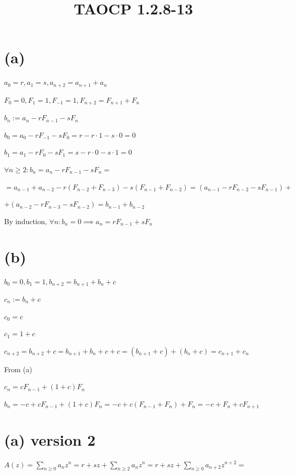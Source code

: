 \documentclass{article}
\title{TAOCP 1.2.8\mbox{-}13}
\begin{document}
\maketitle

\section*{(a)}

\( a_{0} = r, a_{1}=s, a_{n+2} = a_{n+1} + a_{n} \)

\( F_{0} = 0, F_{1}=1, F_{-1}=1, F_{n+2} = F_{n+1} + F_{n} \)

\( b_{n} := a_{n} - rF_{n-1} - sF_{n} \)

\( b_{0} = a_{0} - rF_{-1} - s F_{0} = r - r \cdot 1 - s \cdot 0 = 0 \)

\( b_{1} = a_{1} - rF_{0} - s F_{1} = s - r \cdot 0 - s \cdot 1 = 0 \)

\( \forall n \geq 2: b_{n} = a_{n} - rF_{n-1} - sF_{n} = \)

\( = a_{n-1} + a_{n-2} - r (F_{n-2} + F_{n-3}) - s (F_{n-1} + F_{n-2}) = (a_{n-1} - rF_{n-2} - sF_{n-1}) + \)

\( + (a_{n-2} - rF_{n-3} - sF_{n-2})  = b_{n-1} + b_{n-2} \)

By induction, \( \forall n: b_{n} = 0 \implies a_{n} = rF_{n-1} + s F_{n} \)

\section*{(b)}

\( b_{0} = 0, b_{1} = 1, b_{n+2} = b_{n+1} + b_{n} + c \)

\( c_{n} := b_{n} + c \)

\( c_{0} = c \)

\( c_{1} = 1 + c \)

\( c_{n + 2} = b_{n+2} + c = b_{n+1} + b_{n} + c + c= (b_{n+1} + c) + (b_{n} + c) = c_{n+1} + c_{n} \)

From (a)

\( c_{n} = cF_{n-1} + (1+c)F_{n} \)

\( b_{n} = -c + cF_{n-1} + (1+c)F_{n} = -c + c(F_{n-1}+F_{n}) + F_{n} = -c + F_{n} + cF_{n+1} \)

\section*{(a) version 2}

\( A(z) = \sum_{n \geq 0} a_{n} z^{n} = r + sz + \sum_{n \geq 2} a_{n} z^{n} = r + sz + \sum_{n \geq 0} a_{n+2}z^{n+2} = \)
\end{document}
